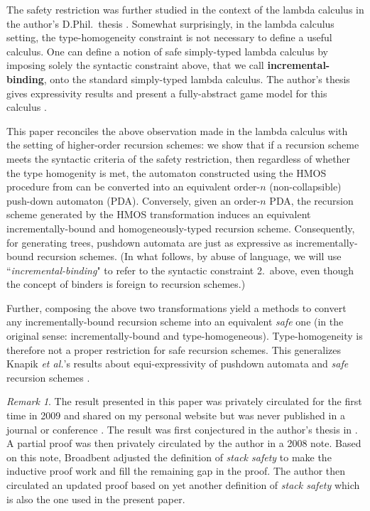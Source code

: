 \documentclass[a4paper]{article}[12pt]
\theoremstyle{remark}
\newtheorem{remark}{Remark}[section]
\theoremstyle{definition}
\begin{document}
The safety restriction was further studied in the context of the lambda calculus
in the author's D.Phil.\ thesis \cite{BlumPhd}. Somewhat surprisingly, in the
lambda calculus setting, the type-homogeneity constraint is not necessary to
define a useful calculus. One can define a notion of safe simply-typed lambda
calculus by imposing solely the syntactic constraint above, that we call
\textbf{incremental-binding}, onto the standard simply-typed lambda calculus.
The author's thesis gives expressivity results and present a fully-abstract game
model for this calculus \cite{BlumPhd}.

This paper reconciles the above observation made in the lambda calculus with the setting of higher-order recursion schemes: we show that if a recursion scheme meets the syntactic criteria of the safety restriction, then regardless of whether the type homogenity is met, the automaton constructed using the HMOS procedure from \cite{hmos-lics08} can be converted into an equivalent order-$n$ (non-collapsible) push-down automaton (PDA). Conversely, given an order-$n$ PDA, the recursion scheme generated by the HMOS transformation induces an equivalent incrementally-bound and homogeneously-typed recursion scheme.
Consequently, for generating trees, pushdown automata are just as expressive as incrementally-bound recursion schemes.
(In what follows, by abuse of language, we will use ``\emph{incremental-binding}" to refer to the syntactic constraint 2.\ above, even though the concept of binders is foreign to recursion schemes.)

Further, composing the above two transformations yield a methods to
convert any incrementally-bound recursion scheme into an equivalent \emph{safe} one (in the original sense: incrementally-bound and type-homogeneous). Type-homogeneity is therefore not a proper restriction for safe recursion schemes. This generalizes Knapik \emph{et al.}'s results about  equi-expressivity of pushdown automata and \emph{safe} recursion schemes \cite{KNU02}.
\vspace{1em}

\begin{remark}
The result presented in this paper was privately circulated for the first time in 2009 and shared on my personal website but was never published in a journal or conference \cite{blum-safehomogeneity-note}.
The result was first conjectured in the author's thesis in \cite{BlumPhd}. A partial proof was then privately circulated by the author in a 2008 note. Based on this note, Broadbent \cite{Broadbent2009} adjusted the definition of \emph{stack safety} to make the inductive proof work and fill the remaining gap in the proof. The author then circulated an updated proof based on yet another definition of \emph{stack safety} which is also the one used in the present paper.
\end{remark}
\end{document}
